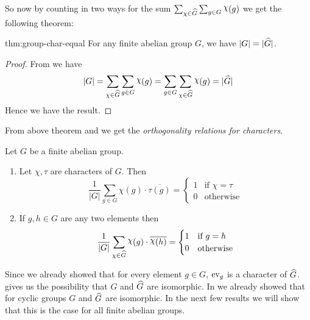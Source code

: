 So now by counting in two ways for the sum $\sum_{\oldchi\in \hG}\sum_{g\in G}\chi(g)$ we get the following theorem:
\begin{Theorem}{}{thm:group-char-equal}
  For any finite abelian group $G$, we have $|G|=|\widehat{G}|$.
\end{Theorem}
\begin{proof}
  From  we have $$|G|=\sum_{\oldchi\in \hG}\sum_{g\in G}\chi(g)=\sum_{g\in G}\sum_{\oldchi\in \hG}\chi(g)=|\hG|$$Hence we have the result.
\end{proof}

From above theorem and  we get the \emph{orthogonality relations for characters}.
\begin{observation}\label{obs:orthogonal-relation}
  Let $G$ be a finite abelian group.
  \begin{enumerate}[label=(\roman*)]
    \item Let $\chi,\tau$ are characters of $G$. Then $$\frac{1}{|G|}\sum_{g\in G}\chi(g)\cdot \overline {\tau(g)}=\begin{cases}
              1 & \text{if $\chi=\tau$} \\
              0 & \text{otherwise}
            \end{cases}$$
    \item If $g,h\in G$ are any two elements then $$\frac{1}{|G|}\sum_{\oldchi\in \hG}\chi(g)\cdot \overline{\chi(h)}=\begin{cases}
              1 & \text{if $g=h$}  \\
              0 & \text{otherwise}
            \end{cases}$$
  \end{enumerate}
\end{observation}

Since we already showed that for every element $g\in G$, $\operatorname{ev}_g$ is a character of $\widehat{G}$.  gives us the possibility that $G$ and $\widehat{G}$ are isomorphic. In  we already showed that for cyclic groups $G$ and $\widehat{G}$ are isomorphic. In the next few results we will show that this is the case for all finite abelian groups.

